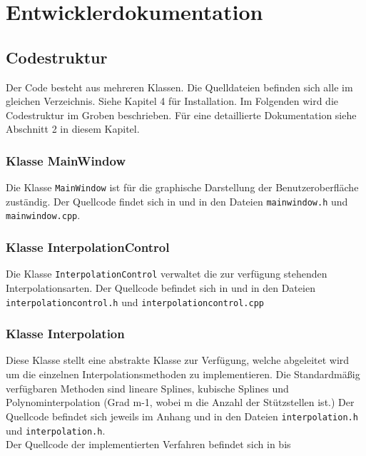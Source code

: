 \chapter{Entwicklerdokumentation}
\label{ch:5}

\section{Codestruktur}
Der Code besteht aus mehreren Klassen. Die Quelldateien befinden sich alle im gleichen Verzeichnis. Siehe Kapitel 4 f\"ur Installation. Im Folgenden wird die Codestruktur im Groben beschrieben. F\"ur eine detaillierte Dokumentation siehe Abschnitt 2 in diesem Kapitel.

\subsection{Klasse MainWindow}
Die Klasse {\tt MainWindow} ist f\"ur die graphische Darstellung der Benutzeroberfl\"ache zust\"andig. Der Quellcode findet sich in  und in den Dateien {\tt mainwindow.h} und {\tt mainwindow.cpp}.

\subsection{Klasse InterpolationControl}
Die Klasse {\tt InterpolationControl} verwaltet die zur verf\"ugung stehenden Interpolationsarten. Der Quellcode befindet sich in  und in den Dateien {\tt interpolationcontrol.h} und {\tt interpolationcontrol.cpp}

\subsection{Klasse Interpolation}
Diese Klasse stellt eine abstrakte Klasse zur Verf\"ugung, welche abgeleitet wird um die einzelnen Interpolationsmethoden zu implementieren. Die Standardm\"a\ss ig verf\"ugbaren Methoden sind lineare Splines, kubische Splines  und Polynominterpolation (Grad m-1, wobei m die Anzahl der St\"utzstellen ist.) Der Quellcode befindet sich jeweils im Anhang  und in den Dateien {\tt interpolation.h} und {\tt interpolation.h}.\\ 
Der Quellcode der implementierten Verfahren befindet sich in  bis 


